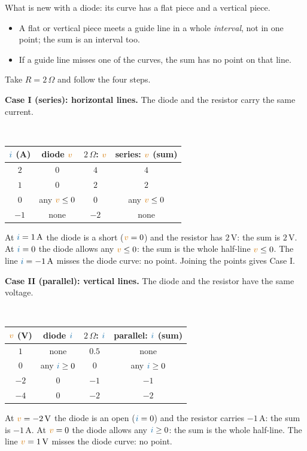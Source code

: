 \documentclass[11pt,a4paper]{article}
\newcommand{\Icol}[1]{\textcolor{ccur}{#1}}
\newcommand{\Vcol}[1]{\textcolor{cvolt}{#1}}
\newcommand{\uni}[1]{\,\mathrm{#1}}
\newcommand{\A}{\uni{A}}   \newcommand{\V}{\uni{V}}
\newcommand{\ohm}{\,\Omega}
\newcommand{\minic}[3]{%
  \begin{scope}[shift={(#1-0.55,1.75)}, scale=\miniscale, transform shape]
    \draw (0,#2) node[ocirc] {}; \draw (0,0) node[ocirc] {};
    #3
  \end{scope}}
\newcommand{\mlab}[1]{{\Large #1}}
\newcommand{\miniscale}{0.62}
\newcommand{\mD}[3]{\draw (#1,#2) to[D*] (#1,#3);}
\newcommand{\mR}[4]{\draw (#1,#2) to[R, l=\mlab{#4}] (#1,#3);}
\newcommand{\mW}[2]{\draw (0,#1) -- (#2,#1); \draw (0,0) -- (#2,0);}                             %
\newcommand{\miniD}[1]{\minic{#1}{2.2}{\mW{2.2}{0.8} \mD{0.8}{2.2}{0}}}
\newcommand{\miniR}[2]{\minic{#1}{2.2}{\mW{2.2}{0.8} \mR{0.8}{2.2}{0}{#2}}}
\newcommand{\miniDsR}[2]{\minic{#1}{3.6}{\mW{3.6}{0.8} \mR{0.8}{3.6}{1.8}{#2} \mD{0.8}{1.8}{0}}}
\newcommand{\miniDpR}[2]{\minic{#1}{2.2}{\mW{2.2}{2.0} \mD{0.8}{2.2}{0} \mR{2.0}{2.2}{0}{#2}}}
\newcommand{\addSer}[1]{%
  \path (-0.2,-1.98) rectangle (12.68,4.072);
  \draw[vax] (0,0) -- (2.88,0) node[right=0pt, font=\tiny, text=cvolt] {$v$};
  \draw[vax] (1.08,-1.08) -- (1.08,1.872) node[above=0pt, font=\tiny, text=ccur] {$i$};
  \draw[gray!60] (1.8,-0.05) -- (1.8,0.05); \node[font=\tiny, text=gray, below] at (1.8,-0.03) {$2$};
  \draw[gray!60] (2.52,-0.05) -- (2.52,0.05); \node[font=\tiny, text=gray, below] at (2.52,-0.03) {$4$};
  \draw[gray!60] (1.03,0.72) -- (1.13,0.72); \node[font=\tiny, text=gray, left] at (1.06,0.72) {$1$};
  \draw[gray!60] (1.03,1.44) -- (1.13,1.44); \node[font=\tiny, text=gray, left] at (1.06,1.44) {$2$};
  \node[font=\scriptsize, text=metugray] at (1.44,-1.63) {diode};
  \begin{scope}[yshift=0.372cm]\miniD{1.49}\end{scope}
  \draw[crv] (0,0) -- (1.08,0) -- (1.08,1.8);
  \ifnum#1>1 \draw[gline] (0,0.72) -- (2.88,0.72); \node[gdot] at (1.08,0.72) {}; \fi
  \ifnum#1>2 \draw[gline] (0,1.44) -- (2.88,1.44); \node[gdot] at (1.08,1.44) {}; \fi
  \ifnum#1>2 \draw[gline] (0,0) -- (2.88,0); \draw[ival] (0,0) -- (1.08,0); \fi
  \ifnum#1>2 \draw[gline] (0,-0.72) -- (2.88,-0.72); \node[font=\tiny, text=metured, anchor=south west, inner sep=1pt] at (0,-0.72) {none}; \fi
  \draw[vax] (4.6,0) -- (7.48,0) node[right=0pt, font=\tiny, text=cvolt] {$v$};
  \draw[vax] (5.68,-1.08) -- (5.68,1.872) node[above=0pt, font=\tiny, text=ccur] {$i$};
  \draw[gray!60] (6.4,-0.05) -- (6.4,0.05); \node[font=\tiny, text=gray, below] at (6.4,-0.03) {$2$};
  \draw[gray!60] (7.12,-0.05) -- (7.12,0.05); \node[font=\tiny, text=gray, below] at (7.12,-0.03) {$4$};
  \draw[gray!60] (5.63,0.72) -- (5.73,0.72); \node[font=\tiny, text=gray, left] at (5.66,0.72) {$1$};
  \draw[gray!60] (5.63,1.44) -- (5.73,1.44); \node[font=\tiny, text=gray, left] at (5.66,1.44) {$2$};
  \node[font=\scriptsize, text=metugray] at (6.04,-1.63) {$2\ohm$};
  \begin{scope}[yshift=0.372cm]\miniR{6.09}{$2\ohm$}\end{scope}
  \draw[crv] (4.6,-1.08) -- (7.48,1.8);
  \ifnum#1>1 \draw[gline] (4.6,0.72) -- (7.48,0.72); \node[gdot] at (6.4,0.72) {}; \fi
  \ifnum#1>2 \draw[gline] (4.6,1.44) -- (7.48,1.44); \node[gdot] at (7.12,1.44) {}; \fi
  \ifnum#1>2 \draw[gline] (4.6,0) -- (7.48,0); \node[gdot] at (5.68,0) {}; \fi
  \ifnum#1>2 \draw[gline] (4.6,-0.72) -- (7.48,-0.72); \node[gdot] at (4.96,-0.72) {}; \fi
  \draw[vax] (9.2,0) -- (12.08,0) node[right=0pt, font=\tiny, text=cvolt] {$v$};
  \draw[vax] (10.28,-1.08) -- (10.28,1.872) node[above=0pt, font=\tiny, text=ccur] {$i$};
  \draw[gray!60] (11,-0.05) -- (11,0.05); \node[font=\tiny, text=gray, below] at (11,-0.03) {$2$};
  \draw[gray!60] (11.72,-0.05) -- (11.72,0.05); \node[font=\tiny, text=gray, below] at (11.72,-0.03) {$4$};
  \draw[gray!60] (10.23,0.72) -- (10.33,0.72); \node[font=\tiny, text=gray, left] at (10.26,0.72) {$1$};
  \draw[gray!60] (10.23,1.44) -- (10.33,1.44); \node[font=\tiny, text=gray, left] at (10.26,1.44) {$2$};
  \node[font=\scriptsize, text=metugray] at (10.64,-1.63) {series};
  \begin{scope}[yshift=0.372cm]\miniDsR{10.69}{$2\ohm$}\end{scope}
  \ifnum#1>3 \draw[crv] (9.2,0) -- (10.28,0) -- (12.08,1.8); \fi
  \ifnum#1>1 \draw[gline] (9.2,0.72) -- (12.08,0.72); \node[gdot] at (11,0.72) {}; \fi
  \ifnum#1>2 \draw[gline] (9.2,1.44) -- (12.08,1.44); \node[gdot] at (11.72,1.44) {}; \fi
  \ifnum#1>2 \draw[gline] (9.2,0) -- (12.08,0); \draw[ival] (9.2,0) -- (10.28,0); \fi
  \ifnum#1>2 \draw[gline] (9.2,-0.72) -- (12.08,-0.72); \node[font=\tiny, text=metured, anchor=south west, inner sep=1pt] at (9.2,-0.72) {none}; \fi
  \node[font=\large] at (3.86,0.842) {\shortstack{$+$\\[1pt]{\tiny add $v$}}};
  \node[font=\large] at (8.46,0.842) {$=$};
}
\newcommand{\addPar}[1]{%
  \path (-0.2,-2.388) rectangle (12.53,3.088);
  \draw[vax] (0,0) -- (2.73,0) node[right=0pt, font=\tiny, text=cvolt] {$v$};
  \draw[vax] (1.89,-1.488) -- (1.89,1.488) node[above=0pt, font=\tiny, text=ccur] {$i$};
  \draw[gray!60] (0.21,-0.05) -- (0.21,0.05); \node[font=\tiny, text=gray, below] at (0.21,-0.03) {$-4$};
  \draw[gray!60] (1.05,-0.05) -- (1.05,0.05); \node[font=\tiny, text=gray, below] at (1.05,-0.03) {$-2$};
  \draw[gray!60] (1.84,-1.24) -- (1.94,-1.24); \node[font=\tiny, text=gray, left] at (1.87,-1.24) {$-2$};
  \draw[gray!60] (1.84,-0.62) -- (1.94,-0.62); \node[font=\tiny, text=gray, left] at (1.87,-0.62) {$-1$};
  \draw[gray!60] (1.84,0.62) -- (1.94,0.62); \node[font=\tiny, text=gray, left] at (1.87,0.62) {$1$};
  \node[font=\scriptsize, text=metugray] at (1.365,-2.038) {diode};
  \begin{scope}[yshift=-0.012cm]\miniD{1.415}\end{scope}
  \draw[crv] (0,0) -- (1.89,0) -- (1.89,1.426);
  \ifnum#1>1 \draw[gline] (1.05,-1.488) -- (1.05,1.488); \node[gdot] at (1.05,0) {}; \fi
  \ifnum#1>2 \draw[gline] (0.21,-1.488) -- (0.21,1.488); \node[gdot] at (0.21,0) {}; \fi
  \ifnum#1>2 \draw[gline] (1.89,-1.488) -- (1.89,1.488); \draw[ival] (1.89,0) -- (1.89,1.426); \fi
  \ifnum#1>2 \draw[gline] (2.31,-1.488) -- (2.31,1.488); \node[font=\tiny, text=metured, anchor=west, inner sep=1pt] at (2.31,1.395) {none}; \fi
  \draw[vax] (4.6,0) -- (7.33,0) node[right=0pt, font=\tiny, text=cvolt] {$v$};
  \draw[vax] (6.49,-1.488) -- (6.49,1.488) node[above=0pt, font=\tiny, text=ccur] {$i$};
  \draw[gray!60] (4.81,-0.05) -- (4.81,0.05); \node[font=\tiny, text=gray, below] at (4.81,-0.03) {$-4$};
  \draw[gray!60] (5.65,-0.05) -- (5.65,0.05); \node[font=\tiny, text=gray, below] at (5.65,-0.03) {$-2$};
  \draw[gray!60] (6.44,-1.24) -- (6.54,-1.24); \node[font=\tiny, text=gray, left] at (6.47,-1.24) {$-2$};
  \draw[gray!60] (6.44,-0.62) -- (6.54,-0.62); \node[font=\tiny, text=gray, left] at (6.47,-0.62) {$-1$};
  \draw[gray!60] (6.44,0.62) -- (6.54,0.62); \node[font=\tiny, text=gray, left] at (6.47,0.62) {$1$};
  \node[font=\scriptsize, text=metugray] at (5.965,-2.038) {$2\ohm$};
  \begin{scope}[yshift=-0.012cm]\miniR{6.015}{$2\ohm$}\end{scope}
  \draw[crv] (4.6,-1.395) -- (7.33,0.62);
  \ifnum#1>1 \draw[gline] (5.65,-1.488) -- (5.65,1.488); \node[gdot] at (5.65,-0.62) {}; \fi
  \ifnum#1>2 \draw[gline] (4.81,-1.488) -- (4.81,1.488); \node[gdot] at (4.81,-1.24) {}; \fi
  \ifnum#1>2 \draw[gline] (6.49,-1.488) -- (6.49,1.488); \node[gdot] at (6.49,0) {}; \fi
  \ifnum#1>2 \draw[gline] (6.91,-1.488) -- (6.91,1.488); \node[gdot] at (6.91,0.31) {}; \fi
  \draw[vax] (9.2,0) -- (11.93,0) node[right=0pt, font=\tiny, text=cvolt] {$v$};
  \draw[vax] (11.09,-1.488) -- (11.09,1.488) node[above=0pt, font=\tiny, text=ccur] {$i$};
  \draw[gray!60] (9.41,-0.05) -- (9.41,0.05); \node[font=\tiny, text=gray, below] at (9.41,-0.03) {$-4$};
  \draw[gray!60] (10.25,-0.05) -- (10.25,0.05); \node[font=\tiny, text=gray, below] at (10.25,-0.03) {$-2$};
  \draw[gray!60] (11.04,-1.24) -- (11.14,-1.24); \node[font=\tiny, text=gray, left] at (11.07,-1.24) {$-2$};
  \draw[gray!60] (11.04,-0.62) -- (11.14,-0.62); \node[font=\tiny, text=gray, left] at (11.07,-0.62) {$-1$};
  \draw[gray!60] (11.04,0.62) -- (11.14,0.62); \node[font=\tiny, text=gray, left] at (11.07,0.62) {$1$};
  \node[font=\scriptsize, text=metugray] at (10.565,-2.038) {parallel};
  \begin{scope}[yshift=-0.012cm]\miniDpR{10.615}{$2\ohm$}\end{scope}
  \ifnum#1>3 \draw[crv] (9.2,-1.395) -- (11.09,0) -- (11.09,1.426); \fi
  \ifnum#1>1 \draw[gline] (10.25,-1.488) -- (10.25,1.488); \node[gdot] at (10.25,-0.62) {}; \fi
  \ifnum#1>2 \draw[gline] (9.41,-1.488) -- (9.41,1.488); \node[gdot] at (9.41,-1.24) {}; \fi
  \ifnum#1>2 \draw[gline] (11.09,-1.488) -- (11.09,1.488); \draw[ival] (11.09,0) -- (11.09,1.426); \fi
  \ifnum#1>2 \draw[gline] (11.51,-1.488) -- (11.51,1.488); \node[font=\tiny, text=metured, anchor=west, inner sep=1pt] at (11.51,1.395) {none}; \fi
  \node[font=\large] at (3.785,0.67) {\shortstack{$+$\\[1pt]{\tiny add $i$}}};
  \node[font=\large] at (8.385,0.67) {$=$};
}
\begin{document}
What is new with a diode: its curve has a flat piece and a vertical piece.
\begin{itemize}[itemsep=2pt]
  \item A flat or vertical piece meets a guide line in a whole \emph{interval}, not in one point;
        the sum is an interval too.
  \item If a guide line misses one of the curves, the sum has no point on that line.
\end{itemize}

Take $R = 2\ohm$ and follow the four steps.

\textbf{Case I (series): horizontal lines.} The diode and the resistor carry the same current.
\begin{center}
\\[4pt]
\small
\begin{tabular}{@{}cccc@{}}
\toprule
$\Icol{i}$ (A) & diode $\Vcol{v}$ & $2\ohm$: $\Vcol{v}$ & series: $\Vcol{v}$ (sum)\\
\midrule
$2$ & $0$ & $4$ & $4$\\
$1$ & $0$ & $2$ & $2$\\
$0$ & any $\Vcol{v} \leq 0$ & $0$ & any $\Vcol{v} \leq 0$\\
$-1$ & none & $-2$ & none\\
\bottomrule
\end{tabular}
\end{center}
At $\Icol{i} = 1\A$ the diode is a short ($\Vcol{v} = 0$) and the resistor has $2\V$: the sum is
$2\V$. At $\Icol{i} = 0$ the diode allows any $\Vcol{v} \leq 0$: the sum is the whole half-line
$\Vcol{v} \leq 0$. The line $\Icol{i} = -1\A$ misses the diode curve: no point. Joining the
points gives Case I.

\textbf{Case II (parallel): vertical lines.} The diode and the resistor have the same voltage.
\begin{center}
\\[4pt]
\small
\begin{tabular}{@{}cccc@{}}
\toprule
$\Vcol{v}$ (V) & diode $\Icol{i}$ & $2\ohm$: $\Icol{i}$ & parallel: $\Icol{i}$ (sum)\\
\midrule
$1$ & none & $0.5$ & none\\
$0$ & any $\Icol{i} \geq 0$ & $0$ & any $\Icol{i} \geq 0$\\
$-2$ & $0$ & $-1$ & $-1$\\
$-4$ & $0$ & $-2$ & $-2$\\
\bottomrule
\end{tabular}
\end{center}
At $\Vcol{v} = -2\V$ the diode is an open ($\Icol{i} = 0$) and the resistor carries $-1\A$: the
sum is $-1\A$. At $\Vcol{v} = 0$ the diode allows any $\Icol{i} \geq 0$: the sum is the whole
half-line. The line $\Vcol{v} = 1\V$ misses the diode curve: no point.
\end{document}
